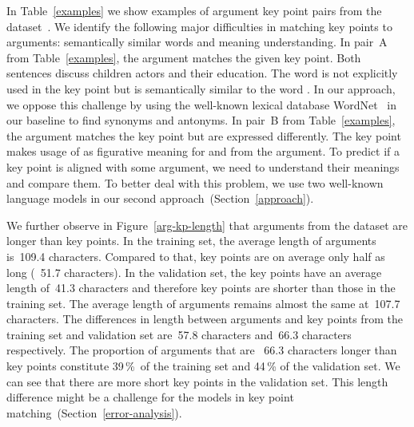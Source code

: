 In Table~\ref{examples} we show examples of argument key point pairs from the \ArgKP dataset~\cite{Bar-HaimEFKLS2020}. 
We identify the following major difficulties in matching key points to arguments: semantically similar words and meaning 
understanding.
In pair~A from Table~\ref{examples}, the argument matches the given key point. Both sentences discuss 
children actors and their education. The word  is not explicitly used in the key point but is 
semantically similar to the word . 
In our approach, we oppose this challenge by using the well-known lexical database WordNet~\cite{Miller1995} in our 
baseline to find synonyms and antonyms.
In pair~B from Table~\ref{examples}, the argument matches the key point but are expressed differently. 
The key point makes usage of  as figurative meaning for  and  from the argument. 
To predict if a key point is aligned with some argument, we need to understand their meanings and compare them. 
To better deal with this problem, we use two well-known language models in our second approach~(Section~\ref{approach}). 

We further observe in Figure~\ref{arg-kp-length} that arguments from the \ArgKP dataset are longer than key points.
In the training set, the average length of arguments is~109.4 characters. 
Compared to that, key points are on average only half as long (~51.7 characters). 
In the validation set, the key points have an average length of~41.3 characters and therefore key points are shorter than those in the training set. 
The average length of arguments remains almost the same at~107.7 characters. 
The differences in length between arguments and key points from the training set and validation set are~57.8 characters and~66.3 characters respectively. 
The proportion of arguments that are ~66.3 characters longer than key points constitute 39\,\%~of the training set 
and 44\,\% of the validation set. 
We can see that there are more short key points in the validation set. 
This length difference might be a challenge for the models in key point matching~(Section~\ref{error-analysis}).
